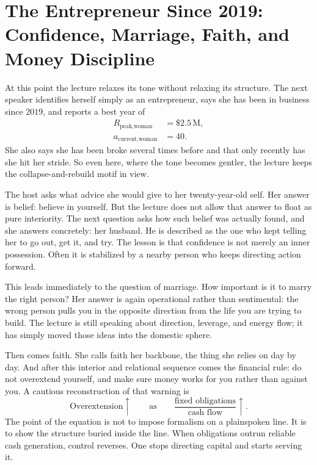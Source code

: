 \section{The Entrepreneur Since 2019: Confidence, Marriage, Faith, and Money Discipline}

At this point the lecture relaxes its tone without relaxing its structure. The next speaker identifies herself simply as an entrepreneur, says she has been in business since \(2019\), and reports a best year of
\begin{align}
R_{\text{peak,woman}} &= \text{\$}2.5\,\mathrm{M},\\
a_{\text{current,woman}} &= 40.
\end{align}
She also says she has been broke several times before and that only recently has she hit her stride. So even here, where the tone becomes gentler, the lecture keeps the collapse-and-rebuild motif in view.

The host asks what advice she would give to her twenty-year-old self. Her answer is belief: believe in yourself. But the lecture does not allow that answer to float as pure interiority. The next question asks how such belief was actually found, and she answers concretely: her husband. He is described as the one who kept telling her to go out, get it, and try. The lesson is that confidence is not merely an inner possession. Often it is stabilized by a nearby person who keeps directing action forward.

This leads immediately to the question of marriage. How important is it to marry the right person? Her answer is again operational rather than sentimental: the wrong person pulls you in the opposite direction from the life you are trying to build. The lecture is still speaking about direction, leverage, and energy flow; it has simply moved those ideas into the domestic sphere.

Then comes faith. She calls faith her backbone, the thing she relies on day by day. And after this interior and relational sequence comes the financial rule: do not overextend yourself, and make sure money works for you rather than against you. A cautious reconstruction of that warning is
\begin{equation}
\text{Overextension} \uparrow
\qquad \text{as} \qquad
\frac{\text{fixed obligations}}{\text{cash flow}} \uparrow.
\end{equation}
The point of the equation is not to impose formalism on a plainspoken line. It is to show the structure buried inside the line. When obligations outrun reliable cash generation, control reverses. One stops directing capital and starts serving it.

